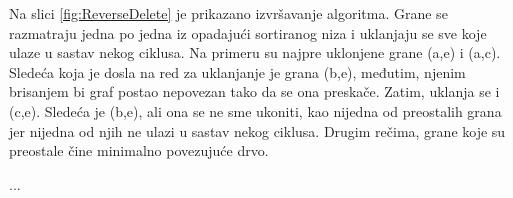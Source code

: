\documentclass[12pt,oneside]{memoir}
\begin{document}
Na slici \ref{fig:ReverseDelete} je prikazano izvršavanje algoritma. Grane se razmatraju jedna po jedna iz opadajući sortiranog niza i uklanjaju se sve koje ulaze u sastav nekog ciklusa. Na primeru su najpre uklonjene grane (a,e) i (a,c). Sledeća koja je dosla na red za uklanjanje je grana (b,e), međutim, njenim brisanjem bi graf postao nepovezan tako da se ona preskače. Zatim, uklanja se i (c,e). Sledeća je (b,e), ali ona se ne sme ukoniti, kao nijedna od preostalih grana jer nijedna od njih ne ulazi u sastav nekog ciklusa. Drugim rečima, grane koje su preostale čine minimalno povezujuće drvo. 


...
\end{document}
